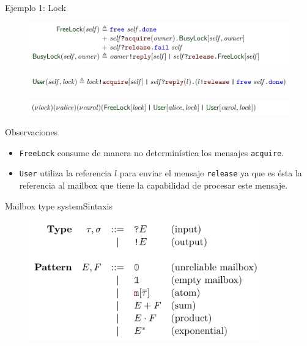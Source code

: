 \documentclass{beamer}
\newcommand{\msgtag}[1]{\texttt{\textcolor{msg-color}{#1}}}
\begin{document}
\begin{frame}{Ejemplo 1: Lock}
    \begin{figure}[H]
        \centering
        \includegraphics[width=\textwidth]{example1-lock}
    \end{figure}
    \vspace{-1em}
    \begin{figure}[H]
        \centering
        \includegraphics[width=\textwidth]{example1-user}
    \end{figure}
    \vspace{-1em}
    \begin{figure}[H]
        \centering
        \includegraphics[width=\textwidth]{example1-usage}
    \end{figure}

    \begin{block}{Observaciones}
        \begin{itemize}
            \item \texttt{FreeLock} consume de manera no determinística los mensajes \msgtag{acquire}.
            \item \texttt{User} utiliza la referencia $l$ para enviar el mensaje \msgtag{release} ya que es ésta la referencia al mailbox que tiene la capabilidad de procesar este mensaje.
        \end{itemize}
    \end{block}
\end{frame}

\begin{frame}{Mailbox type system}{Sintaxis}
    \begin{figure}[H]
        \includegraphics[width=0.9\textwidth]{type-syntax}
    \end{figure}
\end{frame}
\end{document}
